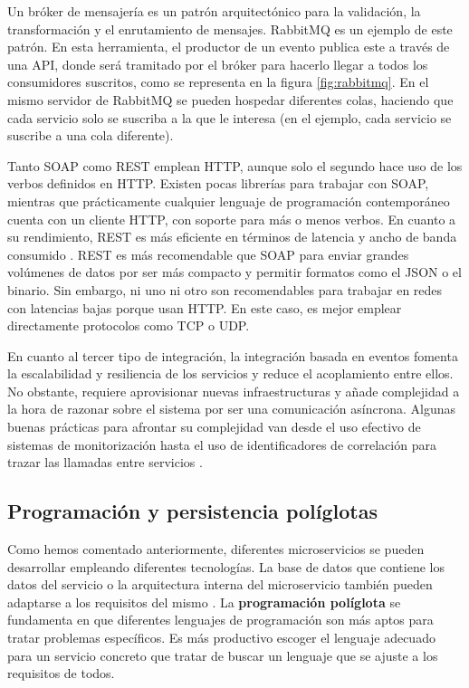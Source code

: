 \documentclass[11pt,spanish,listoffigures]{tfgetsinf}
\begin{document}
\begin{itemize}
Un bróker de mensajería es un patrón arquitectónico para la validación, la transformación y el enrutamiento de mensajes. RabbitMQ es un ejemplo de este patrón. En esta herramienta, el productor de un evento publica este a través de una API, donde será tramitado por el bróker para hacerlo llegar a todos los consumidores suscritos, como se representa en la figura \ref{fig:rabbitmq}. En el mismo servidor de RabbitMQ se pueden hospedar diferentes colas, haciendo que cada servicio solo se suscriba a la que le interesa (en el ejemplo, cada servicio se suscribe a una cola diferente).
 
\end{itemize}

Tanto SOAP como REST emplean HTTP, aunque solo el segundo hace uso de los verbos definidos en HTTP. Existen pocas librerías para trabajar con SOAP, mientras que prácticamente cualquier lenguaje de programación contemporáneo cuenta con un cliente HTTP, con soporte para más o menos verbos. En cuanto a su rendimiento, REST es más eficiente en términos de latencia y ancho de banda consumido \cite{Mulligan}. REST es más recomendable que SOAP para enviar grandes volúmenes de datos por ser más compacto y permitir formatos como el JSON o el binario. Sin embargo, ni uno ni otro son recomendables para trabajar en redes con latencias bajas porque usan HTTP. En este caso, es mejor emplear directamente protocolos como TCP o UDP. 

En cuanto al tercer tipo de integración, la integración basada en eventos fomenta la escalabilidad y resiliencia de los servicios y reduce el acoplamiento entre ellos. No obstante, requiere aprovisionar nuevas infraestructuras y añade complejidad a la hora de razonar sobre el sistema por ser una comunicación asíncrona. Algunas buenas prácticas para afrontar su complejidad van desde el uso efectivo de sistemas de monitorización hasta el uso de identificadores de correlación para trazar las llamadas entre servicios \cite{Newman2015a}. 

\subsection{Programación y persistencia políglotas} \label{subsec:Poliglota}

Como hemos comentado anteriormente, diferentes microservicios se pueden desarrollar empleando diferentes tecnologías. La base de datos que contiene los datos del servicio o la arquitectura interna del microservicio también pueden adaptarse a los requisitos del mismo \cite{DelaTorre2018}. La \textbf{programación políglota} se fundamenta en que diferentes lenguajes de programación son más aptos para tratar problemas específicos. Es más productivo escoger el lenguaje adecuado para un servicio concreto que tratar de buscar un lenguaje que se ajuste a los requisitos de todos.
\end{document}

